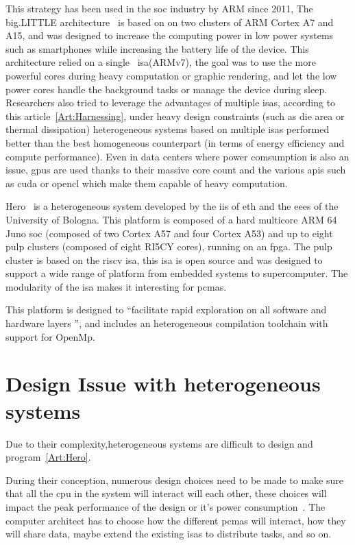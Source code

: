 This strategy has been used in the \gls{soc} industry by ARM since 2011, The  big.LITTLE architecture~\cite{Art:bigLITTLE} is based on on two clusters of ARM Cortex A7 and A15, and  was designed to increase the computing power in low power systems such as smartphones while increasing the battery life of the device. This architecture relied on a single~ \gls{isa}(ARMv7), the goal was to use the more powerful cores during heavy computation or graphic rendering, and let the low power cores handle the background tasks or manage the device during sleep. Researchers also tried to leverage the advantages of multiple \glspl{isa}, according to this article~\ref{Art:Harnessing}, under heavy design constraints (such as die area or thermal dissipation) heterogeneous systems based on multiple \glspl{isa} performed better than the best homogeneous counterpart (in terms of energy efficiency and compute performance). 
Even in data centers where power comsumption is also an issue, \glspl{gpu} are used thanks to their massive core count and the various \glspl{api} such as \gls{cuda} or \gls{opencl} which make them capable of heavy computation.

    Hero~\cite{Art:Hero} is a heterogeneous system developed by the \gls{iis} of \acrshort{eth} and the \gls{eees} of the University of Bologna. This platform is composed of a hard multicore ARM 64 Juno \gls{soc} (composed of two Cortex A57 and four Cortex A53) and up to eight \gls{pulp} clusters (composed of eight RI5CY cores), running on an \gls{fpga}. 
	The \gls{pulp} cluster is based on the \gls{riscv} \gls{isa}, this \gls{isa} is open source and was designed to support a wide range of platform from embedded systems to supercomputer. The modularity of the \gls{isa} makes it interesting for \glspl{pcma}.

	This platform is designed to ``facilitate rapid exploration on all software and hardware layers '', and includes an heterogeneous compilation toolchain with support for OpenMp.



\section {Design Issue with heterogeneous systems}
	Due to their complexity,heterogeneous systems are difficult to design and program~\ref{Art:Hero}.

    During their conception, numerous design choices need to be made to make sure that all the \gls{cpu} in the system will interact will each other, these choices will impact the peak performance of the design or it's power consumption~\cite{Art:Harnessing}. The computer architect has to choose how  the different \glspl{pcma} will interact, how they will share data, maybe extend the existing \glspl{isa} to distribute tasks, and so on.

